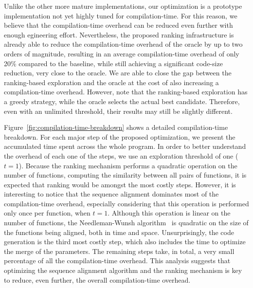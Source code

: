 Unlike the other more mature implementations, our optimization is a prototype
implementation not yet highly tuned for compilation-time.
For this reason, we believe that the compilation-time overhead can be reduced
even further with enough egineering effort.
Nevertheless, the proposed ranking infrastructure is already able to reduce the
compilation-time overhead of the oracle by up to two orders of magnitude,
resulting in  an average compilation-time overhead of only 20\% compared to the
baseline, while still achieving a significant code-size reduction, very close to
the oracle.
We are able to close the gap between the ranking-based exploration and the
oracle at the cost of also increasing a compilation-time overhead.
However, note that the ranking-based exploration has a greedy strategy, while
the oracle selects the actual best candidate.
Therefore, even with an unlimited threshold, their results may still be slightly
different.

Figure~\ref{fig:compilation-time-breakdown} shows a detailed compilation-time
breakdown.
For each major step of the proposed optimization, we present the accumulated
time spent across the whole program.
In order to better understand the overhead of each one of the steps, we use
an exploration threshold of one ($t = 1$).
Because the ranking mechanism performs a quadratic operation on the number of
functions, computing the similarity between all pairs of functions, it is
expected that ranking would be amongst the most costly steps.
However, it is interesting to notice that the sequence alignment dominates most
of the compilation-time overhead, especially considering that this operation is
performed only once per function, when $t = 1$.
Although this operation is linear on the number of functions, the
Needleman-Wunsh algorithm~\cite{needleman70} is quadratic on the size of the
functions being aligned, both in time and space.
Unsurprisingly, the code generation is the third most costly step, which also
includes the time to optimize the merge of the parameters.
The remaining steps take, in total, a very small percentage of all the
compilation-time overhead.
This analysis suggests that optimizing the sequence alignment algorithm and
the ranking mechanism is key to reduce, even further, the overall
compilation-time overhead.

